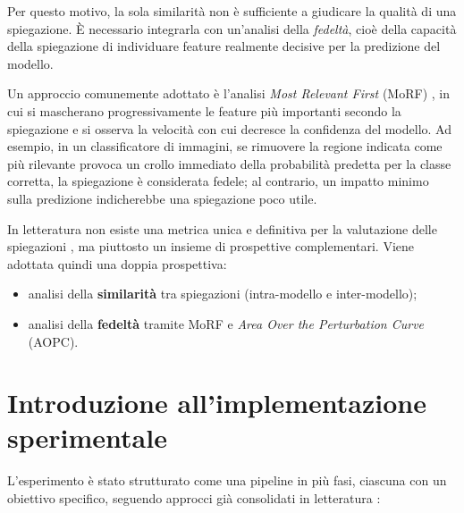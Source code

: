 \documentclass[12pt,a4paper,oneside]{report}
\numberwithin{figure}{chapter}
\numberwithin{table}{chapter}
\begin{document}
Per questo motivo, la sola similarità non è sufficiente a giudicare la qualità
di una spiegazione. È necessario integrarla con un’analisi della
\emph{fedeltà}, cioè della capacità della spiegazione di individuare feature
realmente decisive per la predizione del modello.

Un approccio comunemente adottato è l’analisi \emph{Most Relevant First} (MoRF)
\cite{samek2016evaluating}, in cui si mascherano progressivamente le feature
più importanti secondo la spiegazione e si osserva la velocità con cui decresce
la confidenza del modello. Ad esempio, in un classificatore di immagini, se
rimuovere la regione indicata come più rilevante provoca un crollo immediato
della probabilità predetta per la classe corretta, la spiegazione è considerata
fedele; al contrario, un impatto minimo sulla predizione indicherebbe una
spiegazione poco utile.

In letteratura non esiste una metrica unica e definitiva per la valutazione
delle spiegazioni \cite{adadi2018survey}, ma piuttosto un insieme di
prospettive complementari. Viene adottata quindi una doppia prospettiva:
\begin{itemize}
      \item analisi della \textbf{similarità} tra spiegazioni (intra-modello e
            inter-modello);
      \item analisi della \textbf{fedeltà} tramite MoRF e \emph{Area Over the Perturbation
                  Curve} (AOPC).
\end{itemize}

\chapter{Introduzione all’implementazione sperimentale}

L’esperimento è stato strutturato come una pipeline in più fasi, ciascuna con
un obiettivo specifico, seguendo approcci già consolidati in letteratura
\citep{mueller2023rashomon,leventi2023consistency,adadi2018survey}:
\end{document}
